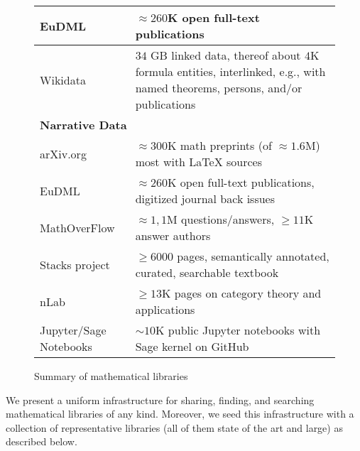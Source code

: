 \begin{figure*}[htp]
\begin{tabular}{| p{} | p{}|}
  EuDML  \cite{EuDML:on} & $\approx 260$K open full-text publications \\\hline
  Wikidata  \cite{wikidata:on} & $34$ GB linked data, thereof about $4$K formula entities, interlinked, e.g., with named theorems, persons, and/or publications \\\hline
  \multicolumn{2}{|l|}{\textbf{Narrative Data}} \\\hline
  arXiv.org & $\approx 300$K math preprints (of $\approx1.6$M) most with {\LaTeX} sources\\\hline
  EuDML  \cite{EuDML:on} & $\approx 260$K open full-text publications, digitized journal back issues \\\hline
  MathOverFlow & $\approx 1,1$M questions/answers, $\geq11$K answer authors \\\hline
  Stacks project & $\geq 6000$ pages, semantically annotated, curated, searchable textbook \\\hline
    nLab & $\geq 13$K pages on category theory and applications\\\hline
    Jupyter/Sage Notebooks & $\sim10$K public Jupyter notebooks with Sage kernel on GitHub\\\hline
\end{tabular}
  \caption{Summary of mathematical libraries}\label{fig:datasets}
\end{figure*}

We present a uniform infrastructure for sharing, finding, and searching mathematical libraries of any kind.
Moreover, we seed this infrastructure with a collection of representative libraries (all of them state of the art and large) as described below.



